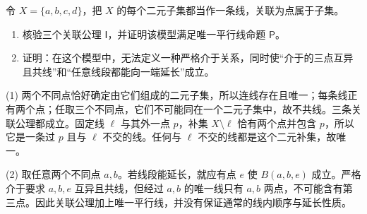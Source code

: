 \BookExercises

\begin{exercise}
	\label{g1:ex:four-point-incidence}
	令 \(X=\{a,b,c,d\}\)，把 \(X\) 的每个二元子集都当作一条线，关联为点属于子集。
	\begin{enumerate}
		\item 核验三个关联公理 \(\mathsf I\)，并证明该模型满足唯一平行线命题 \(\mathsf P\)。
		\item 证明：在这个模型中，无法定义一种严格介于关系，同时使“介于的三点互异且共线”和“任意线段都能向一端延长”成立。
	\end{enumerate}
\end{exercise}
\begin{solution}
	(1) 两个不同点恰好确定由它们组成的二元子集，所以连线存在且唯一；每条线正有两个点；任取三个不同点，它们不可能同在一个二元子集中，故不共线。三条关联公理都成立。固定线 \(\ell\) 与其外一点 \(p\)，补集 \(X\setminus\ell\) 恰有两个点并包含 \(p\)，所以它是一条过 \(p\) 且与 \(\ell\) 不交的线。任何与 \(\ell\) 不交的线都是这个二元补集，故唯一。

	(2) 取任意两个不同点 \(a,b\)。若线段能延长，就应有点 \(e\) 使 \(B(a,b,e)\) 成立。严格介于要求 \(a,b,e\) 互异且共线，但经过 \(a,b\) 的唯一线只有 \(a,b\) 两点，不可能含有第三点。因此关联公理加上唯一平行线，并没有保证通常的线内顺序与延长性质。
\end{solution}

